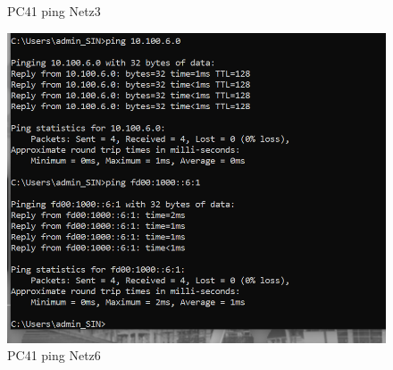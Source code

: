 \documentclass{article}
\begin{document}
\begin{figure}[!htp]
\begin{minipage}[b]{0.3\textwidth}
    \caption{PC41 ping Netz3}
  \end{minipage}
  \hspace{0.8cm}
  \begin{minipage}[b]{0.3\textwidth}
    \includegraphics[width=\textwidth]{Arbeitsergebnisse/PC41/pc41_ping_net6.png}
    \caption{PC41 ping Netz6}
  \end{minipage}
\end{figure}
\end{document}
